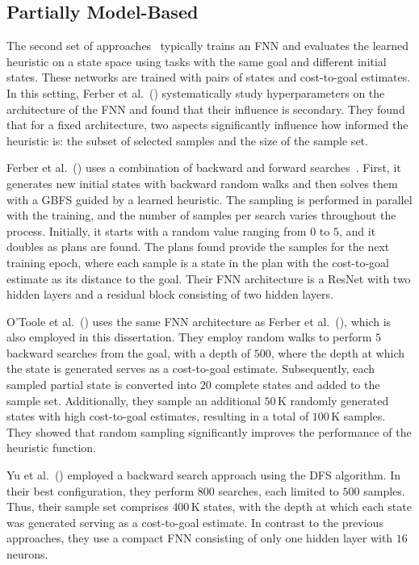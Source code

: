 \subsection{Partially Model-Based}

The second set of approaches~\cite{Ferber.etal/2020a, Yu.etal/2020, Ferber.etal/2022, OToole/2022} typically trains an FNN and evaluates the learned heuristic on a state space using tasks with the same goal and different initial states. These networks are trained with pairs of states and cost-to-goal estimates. In this setting, Ferber et al.~(\citeyear{Ferber.etal/2020a}) systematically study hyperparameters on the architecture of the FNN and found that their influence is secondary. They found that for a fixed architecture, two aspects significantly influence how informed the heuristic is: the subset of selected samples and the size of the sample set. 

Ferber et al.~(\citeyear{Ferber.etal/2022}) uses a combination of backward and forward searches~\cite{Arfaee.etal/2011}. First, it generates new initial states with backward random walks and then solves them with a GBFS guided by a learned heuristic. The sampling is performed in parallel with the training, and the number of samples per search varies throughout the process. Initially, it starts with a random value ranging from $0$ to $5$, and it doubles as plans are found. The plans found provide the samples for the next training epoch, where each sample is a state in the plan with the cost-to-goal estimate as its distance to the goal. Their FNN architecture is a ResNet with two hidden layers and a residual block consisting of two hidden layers.

O'Toole et al.~(\citeyear{OToole/2022}) uses the same FNN architecture as Ferber et al.~(\citeyear{Ferber.etal/2022}), which is also employed in this dissertation. They employ random walks to perform $5$ backward searches from the goal, with a depth of $500$, where the depth at which the state is generated serves as a cost-to-goal estimate. Subsequently, each sampled partial state is converted into $20$ complete states and added to the sample set. Additionally, they sample an additional $50$\,K randomly generated states with high cost-to-goal estimates, resulting in a total of $100$\,K samples. They showed that random sampling significantly improves the performance of the heuristic function.

Yu et al.~(\citeyear{Yu.etal/2020}) employed a backward search approach using the DFS algorithm. In their best configuration, they perform $800$ searches, each limited to $500$ samples. Thus, their sample set comprises $400$\,K states, with the depth at which each state was generated serving as a cost-to-goal estimate. In contrast to the previous approaches, they use a compact FNN consisting of only one hidden layer with $16$ neurons.

